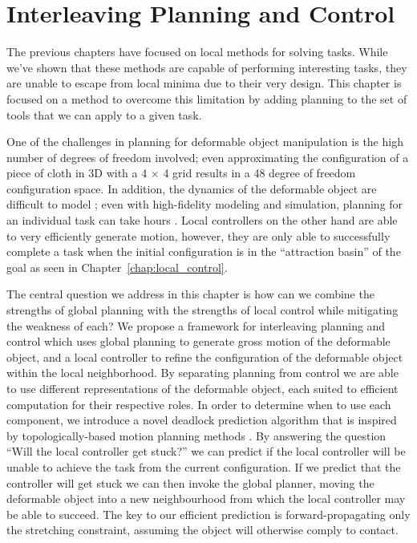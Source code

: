 \chapter{Interleaving Planning and Control}
\label{chap:interleaving}

The previous chapters have focused on local methods for solving tasks. While we've shown that these methods are capable of performing interesting tasks, they are unable to escape from local minima due to their very design. This chapter is focused on a method to overcome this limitation by adding planning to the set of tools that we can apply to a given task.

One of the challenges in planning for deformable object manipulation is the high number of degrees of freedom involved; even approximating the configuration of a piece of cloth in 3D with a 4 $\times$ 4 grid results in a 48 degree of freedom configuration space. In addition, the dynamics of the deformable object are difficult to model \citep{Essahbi2012}; even with high-fidelity modeling and simulation, planning for an individual task can take hours \citep{Bai2016}. Local controllers on the other hand are able to very efficiently generate motion, however, they are only able to successfully complete a task when the initial configuration is in the ``attraction basin'' of the goal as seen in Chapter~\ref{chap:local_control}.

The central question we address in this chapter is how can we combine the strengths of global planning with the strengths of local control while mitigating the weakness of each? We propose a framework for interleaving planning and control which uses global planning to generate gross motion of the deformable object, and a local controller to refine the configuration of the deformable object within the local neighborhood. By separating planning from control we are able to use different representations of the deformable object, each suited to efficient computation for their respective roles. In order to determine when to use each component, we introduce a novel deadlock prediction algorithm that is inspired by topologically-based motion planning methods \cite{Jaillet2008, Bhattacharya2012}. By answering the question ``Will the local controller get stuck?'' we can predict if the local controller will be unable to achieve the task from the current configuration. If we predict that the controller will get stuck we can then invoke the global planner, moving the deformable object into a new neighbourhood from which the local controller may be able to succeed. The key to our efficient prediction is forward-propagating only the stretching constraint, assuming the object will otherwise comply to contact.

